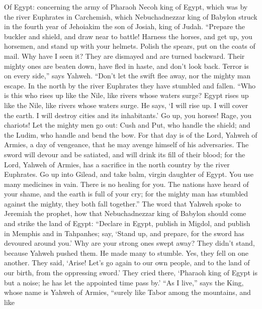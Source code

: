  Of Egypt: concerning the army of Pharaoh Necoh king of
Egypt, which was by the river Euphrates in Carchemish, which
Nebuchadnezzar king of Babylon struck in the fourth year of Jehoiakim
the son of Josiah, king of Judah.  ``Prepare the buckler
and shield, and draw near to battle!  Harness the horses,
and get up, you horsemen, and stand up with your helmets. Polish the
spears, put on the coats of mail.  Why have I seen it?
They are dismayed and are turned backward. Their mighty ones are beaten
down, have fled in haste, and don't look back. Terror is on every
side,'' says Yahweh.  ``Don't let the swift flee away, nor
the mighty man escape. In the north by the river Euphrates they have
stumbled and fallen.  ``Who is this who rises up like the
Nile, like rivers whose waters surge?  Egypt rises up like
the Nile, like rivers whose waters surge. He says, `I will rise up. I
will cover the earth. I will destroy cities and its inhabitants.'
 Go up, you horses! Rage, you chariots! Let the mighty men
go out: Cush and Put, who handle the shield; and the Ludim, who handle
and bend the bow.  For that day is of the Lord, Yahweh of
Armies, a day of vengeance, that he may avenge himself of his
adversaries. The sword will devour and be satiated, and will drink its
fill of their blood; for the Lord, Yahweh of Armies, has a sacrifice in
the north country by the river Euphrates.  Go up into
Gilead, and take balm, virgin daughter of Egypt. You use many medicines
in vain. There is no healing for you.  The nations have
heard of your shame, and the earth is full of your cry; for the mighty
man has stumbled against the mighty, they both fall together.''
 The word that Yahweh spoke to Jeremiah the prophet, how
that Nebuchadnezzar king of Babylon should come and strike the land of
Egypt:  ``Declare in Egypt, publish in Migdol, and
publish in Memphis and in Tahpanhes; say, `Stand up, and prepare, for
the sword has devoured around you.'  Why are your strong
ones swept away? They didn't stand, because Yahweh pushed them.
 He made many to stumble. Yes, they fell on one another.
They said, `Arise! Let's go again to our own people, and to the land of
our birth, from the oppressing sword.'  They cried there,
`Pharaoh king of Egypt is but a noise; he has let the appointed time
pass by.'  ``As I live,'' says the King, whose name is
Yahweh of Armies, ``surely like Tabor among the mountains, and like

